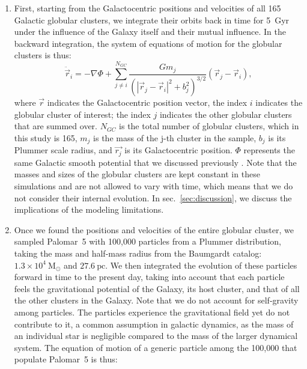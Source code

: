             \begin{enumerate}
                \item First, starting from the Galactocentric positions and velocities of all 165 Galactic globular clusters, we integrate their orbits back in time for 5~Gyr under the influence of the Galaxy itself and their mutual influence. In the backward integration, the system of equations of motion for the globular clusters is thus: 
                \begin{equation}
                    \ddot{\vec{r}}_i = -\nabla \Phi + \left.\sum_{j\neq i}^{N_{GC}} \frac{Gm_j}{\left(|\vec{r}_j - \vec{r}_i|^2 + b_j^2\right)^{3/2}}\right. \left(\vec{r}_j - \vec{r}_i\right),
                \end{equation}\label{eq:GCNBody} 
                \noindent where $\vec{r}$ indicates the Galactocentric position vector, the index $i$ indicates the globular cluster of interest; the index $j$ indicates the other globular clusters that are summed over. $N_{GC}$ is the total number of globular clusters, which in this study is 165, $m_j$ is the mass of the j-th cluster in the sample, $b_j$ is its Plummer scale radius, and $\vec{r_j}$ is its Galactocentric position. $\Phi$ represents the same Galactic smooth potential that we discussed previously \citep[][Model~II, in the present case]{2017A&A...598A..66P}. Note that the masses and sizes of the globular clusters are kept constant in these simulations and are not allowed to vary with time, which means that we do not consider their internal evolution. In sec.~\ref{sec:discussion}, we discuss the implications of the modeling limitations.
                \item Once we found the positions and velocities of the entire globular cluster, we sampled Palomar~5 with 100,000 particles from a Plummer distribution, taking the mass and half-mass radius from the Baumgardt catalog: $1.3\times10^{4}~\textrm{M}_\odot$ and $27.6~\textrm{pc}$. We then integrated the evolution of these particles forward in time to the present day, taking into account that each particle feels the gravitational potential of the Galaxy, its host cluster, and that of all the other clusters in the Galaxy. Note that we do not account for self-gravity among particles. The particles experience the gravitational field yet do not contribute to it, a common assumption in galactic dynamics, as the mass of an individual star is negligible compared to the mass of the larger dynamical system. The equation of motion of a generic particle among the 100,000 that populate Palomar~5 is thus: 

\end{enumerate}
